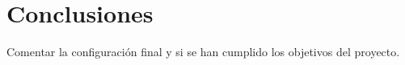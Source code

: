 \chapter{Conclusiones}
Comentar la configuración final y si se han cumplido los objetivos del proyecto.
